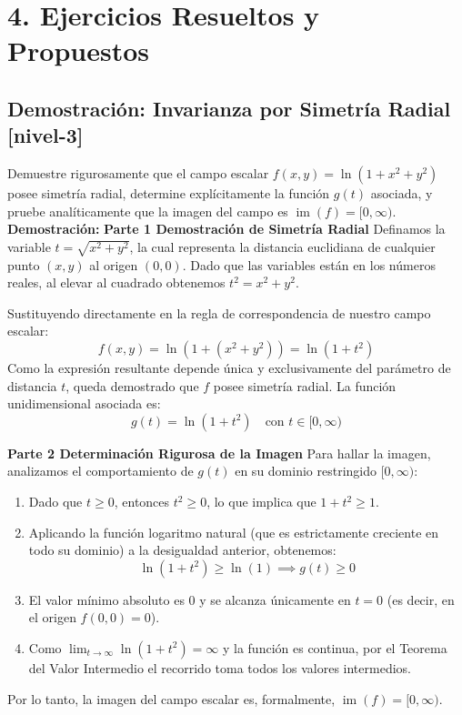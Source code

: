 \documentclass[11pt]{article}
\newenvironment{ejercicios}{%
  \section*{4. Ejercicios Resueltos y Propuestos}%
}{}
\newenvironment{ejerciciodemostracion}[2]{\subsection*{Demostración: #1 \small{[#2]}}}{}
\newcommand{\demostracion}[1]{\textbf{Demostración:} #1\par\vspace{0.4cm}}
\begin{document}
\begin{ejercicios}
\begin{ejerciciodemostracion}{Invarianza por Simetría Radial}{nivel-3}
{      Demuestre rigurosamente que el campo escalar $f(x,y) = \ln(1 + x^2 + y^2)$ posee simetría radial, determine explícitamente la función $g(t)$ asociada, y pruebe analíticamente que la imagen del campo es $\operatorname{im}(f) = [0, \infty)$.
    }
    \demostracion{
      \textbf{Parte 1 \colon Demostración de Simetría Radial}
      Definamos la variable $t = \sqrt{x^2 + y^2}$, la cual representa la distancia euclidiana de cualquier punto $(x,y)$ al origen $(0,0)$. Dado que las variables están en los números reales, al elevar al cuadrado obtenemos $t^2 = x^2 + y^2$. 
      
      Sustituyendo directamente en la regla de correspondencia de nuestro campo escalar:
      $$ f(x,y) = \ln(1 + (x^2 + y^2)) = \ln(1 + t^2) $$
      Como la expresión resultante depende única y exclusivamente del parámetro de distancia $t$, queda demostrado que $f$ posee simetría radial. La función unidimensional asociada es:
      $$ g(t) = \ln(1 + t^2) \quad \text{con } t \in [0, \infty) $$
      
      \textbf{Parte 2 \colon Determinación Rigurosa de la Imagen}
      Para hallar la imagen, analizamos el comportamiento de $g(t)$ en su dominio restringido $[0, \infty)$:
      \begin{enumerate}
        \item Dado que $t \geq 0$, entonces $t^2 \geq 0$, lo que implica que $1 + t^2 \geq 1$.
        \item Aplicando la función logaritmo natural (que es estrictamente creciente en todo su dominio) a la desigualdad anterior, obtenemos:
        $$ \ln(1 + t^2) \geq \ln(1) \implies g(t) \geq 0 $$
        \item El valor mínimo absoluto es $0$ y se alcanza únicamente en $t=0$ (es decir, en el origen $f(0,0) = 0$).
        \item Como $\displaystyle \lim_{t \to \infty} \ln(1 + t^2) = \infty$ y la función es continua, por el Teorema del Valor Intermedio el recorrido toma todos los valores intermedios.
      \end{enumerate}
      Por lo tanto, la imagen del campo escalar es, formalmente, $\operatorname{im}(f) = [0, \infty)$.
    }
  \end{ejerciciodemostracion}


\end{ejercicios}
\end{document}
